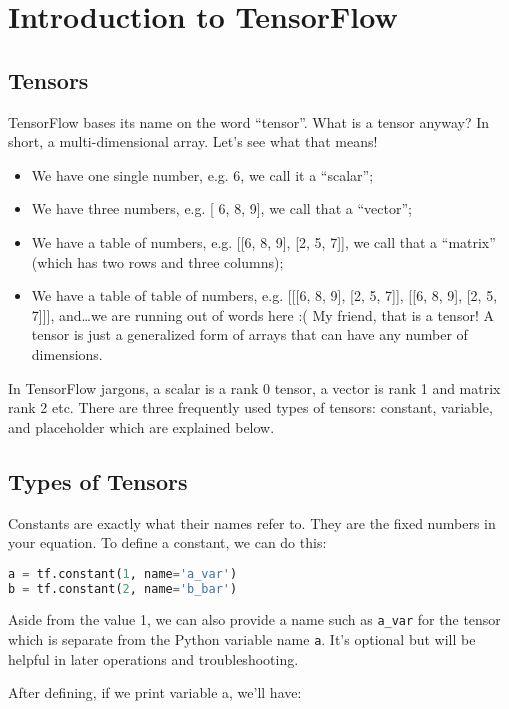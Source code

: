 \section{Introduction to TensorFlow}

\subsection{Tensors}

TensorFlow bases its name on the word ``tensor''. What is a tensor anyway? In short, a multi-dimensional array. Let's see what that means!

\begin{itemize}
\item We have one single number, e.g. 6, we call it a ``scalar'';
\item We have three numbers, e.g. [ 6, 8, 9], we call that a ``vector'';
\item We have a table of numbers, e.g. [[6, 8, 9], [2, 5, 7]], we call that a ``matrix'' (which has two rows and three columns);
\item We have a table of table of numbers, e.g. [[[6, 8, 9], [2, 5, 7]], [[6, 8, 9], [2, 5, 7]]], and…we are running out of words here :( My friend, that is a tensor! A tensor is just a generalized form of arrays that can have any number of dimensions.
\end{itemize}

In TensorFlow jargons, a scalar is a rank 0 tensor, a vector is rank 1 and matrix rank 2 etc. There are three frequently used types of tensors: constant, variable, and placeholder which are explained below.

\subsection{Types of Tensors}

Constants are exactly what their names refer to. They are the fixed numbers in your equation. To define a constant, we can do this:

\begin{lstlisting}[language=Python]
a = tf.constant(1, name='a_var')
b = tf.constant(2, name='b_bar')
\end{lstlisting}
Aside from the value 1, we can also provide a name such as \lstinline{a_var} for the tensor which is separate from the Python variable name \lstinline{a}. It's optional but will be helpful in later operations and troubleshooting.

After defining, if we print variable a, we'll have:

